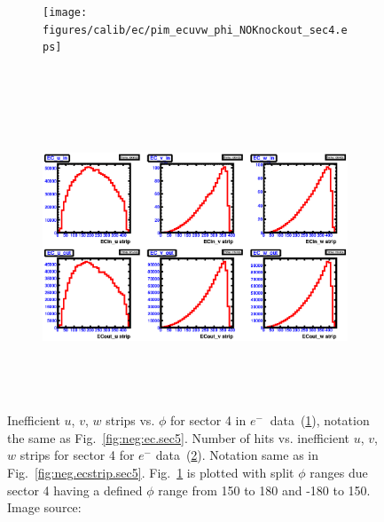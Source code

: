 \begin{figure}[!ht]
  \centering
  \begin{subfigure}[b]{\figwidth}
  \texttt{[image: figures/calib/ec/pim\_ecuvw\_phi\_NOKnockout\_sec4.eps]}\caption{}\label{fig:EC_I_IV}
  \end{subfigure}%
  \\
  \begin{subfigure}[b]{\figwidth}
  \includegraphics[width=\figwidth, height=3.5in,valign=c]{figures/calib/ec/pim_ecuvw_NOKnockout_sec4.eps}\caption{}\label{fig:EC_II_IV}
  \end{subfigure}%
      \caption {Inefficient  $u$, $v$, $w$ strips vs. $\phi$ for sector 4 in  $e^{-} \ $ data~(\ref{fig:EC_I_IV}), notation the same as Fig.~\ref{fig:neg:ec.sec5}. Number of hits vs. inefficient  $u$, $v$, $w$ strips for sector 4 for $e^-$ data~(\ref{fig:EC_II_IV}). Notation same as in Fig.~\ref{fig:neg.ecstrip.sec5}. Fig.~\ref{fig:EC_I_IV} is plotted with split $\phi$ ranges due sector 4 having a defined $\phi$ range from 150 to 180 and -180 to 150. Image source:~\cite{clas.thesis.kunkel}}
        \label{fig:EC_no_IV}
\end{figure}



